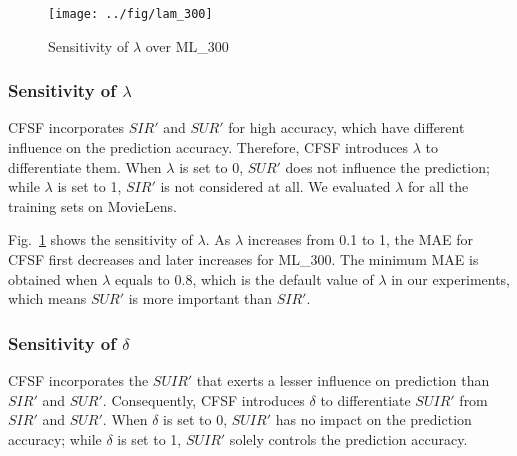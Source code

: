 \begin{figure}[h]
  \centering
  \texttt{[image: ../fig/lam\_300]}
  \vspace{-2ex}\caption{Sensitivity of $\lambda$ over ML\_300}\label{fig:lambda}
\end{figure}



\subsubsection{Sensitivity of $\lambda$}
CFSF incorporates $SIR'$ and $SUR'$ for high accuracy, which have different influence on the prediction accuracy. Therefore, CFSF introduces $\lambda$ to differentiate them. When $\lambda$ is set to 0, $SUR'$ does not influence the prediction; while $\lambda$ is set to 1, $SIR'$ is not considered at all. We evaluated $\lambda$ for all the training sets on MovieLens.

Fig.~\ref{fig:lambda} shows the sensitivity of $\lambda$. As $\lambda$ increases from 0.1 to 1, the MAE for CFSF first decreases and later increases for ML\_300. The minimum MAE is obtained when $\lambda$ equals to 0.8, which is the default value of $\lambda$ in our experiments, which means $SUR'$ is more important than $SIR'$.

\subsubsection{Sensitivity of $\delta$}
CFSF incorporates the $SUIR'$ that exerts a lesser influence on prediction than $SIR'$ and $SUR'$. Consequently, CFSF introduces $\delta$ to differentiate $SUIR'$ from $SIR'$ and $SUR'$. When $\delta$ is set to 0, $SUIR'$ has no impact on the prediction accuracy; while $\delta$ is set to 1, $SUIR'$ solely controls the prediction accuracy.

